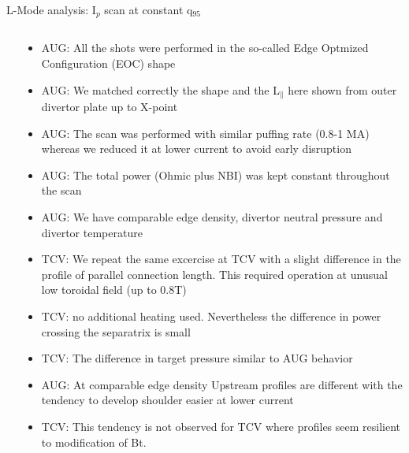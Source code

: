 \documentclass[10pt, compress]{beamer}
\newcommand\Fontvi{\fontsize{8}{7.2}\selectfont}
\begin{document}
\begin{frame}{L-Mode analysis: I$_p$ scan at constant q$_{95}$}
\Fontvi
  \vspace{-1cm}
  \begin{columns}    
  \begin{column}{0.65\textwidth}
  \end{column}
  \begin{column}{0.35\textwidth}
    \begin{itemize}
      \item<1|only@1> AUG: All the shots were performed in the so-called
        Edge Optmized Configuration (EOC) shape
      \item<1|only@1> AUG: We matched correctly the shape and the L$_{\parallel}$
        here shown from outer divertor plate up to X-point 
      \item<2|only@2> AUG: The scan was performed with similar puffing rate (0.8-1
        MA) whereas we reduced it at lower current to avoid early
        disruption
      \item<2|only@2> AUG: The total power (Ohmic plus NBI) was kept
        constant throughout the scan
      \item<2|only@2> AUG: We have comparable edge density, divertor neutral
        pressure and divertor temperature
      \item<3|only@3> TCV: We repeat the same excercise at TCV with a
        slight difference in the profile of parallel connection
        length. This required operation at unusual low toroidal field
        (up to 0.8T)
      \item<4|only@4> TCV: no additional heating
        used. Nevertheless the difference in power crossing the separatrix
        is small
      \item<4|only@4> TCV: The difference in target pressure similar
        to AUG behavior
      \item<5|only@5> AUG: At comparable edge density Upstream profiles are
        different with the tendency to develop shoulder easier at
        lower current
      \item<6|only@6> TCV: This tendency is not observed for TCV where
        profiles seem resilient to modification of Bt. 
        
      \end{itemize}
    \end{column}
\end{columns}
\end{frame}
\end{document}
